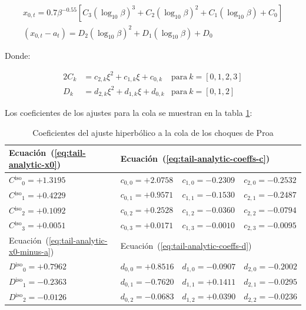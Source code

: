  \begin{align}
   x_{0,t} = 0.7\beta^{-0.55}\left[C_3\left(\log_{10}\beta\right)^3 + C_2\left(\log_{10}\beta\right)^2 +
   C_1\left(\log_{10}\beta\right) + C_0\right] \label{eq:tail-analytic-x0}\\
   (x_{0,t} - a_t) = D_2\left(\log_{10}\beta\right)^2 + D_1\left(\log_{10}\beta\right) + D_0
   \label{eq:tail-analytic-x0-minus-a}
 \end{align}

 Donde:
 
 \begin{alignat}{2}
   \label{eq:tail-analytic-coeffs-c}
   C_k &= c_{2,k}\xi^2 + c_{1,k}\xi + c_{0,k} & \mathrm{para~}k=[0,1,2,3] \\
   \label{eq:tail-analytic-coeffs-d}
   D_k &= d_{2,k}\xi^2 + d_{1,k}\xi + d_{0,k} & \mathrm{para~}k=[0,1,2]
 \end{alignat}

 Los coeficientes de los ajustes para la cola se muestran en la tabla \ref{tab:tail-fit-coeffs}:


\newcommand\iso{\ensuremath{^{\mathrm{iso}}}}

\begin{table}
  \caption{Coeficientes del ajuste hiperbólico a la cola de los choques de Proa}
  \label{tab:tail-fit-coeffs}
  \renewcommand\arraystretch{1.2}
  \setlength\tabcolsep{0.5\tabcolsep}
  \begin{tabular}{@{}llll@{}}
    \toprule
    Ecuación~(\ref{eq:tail-analytic-x0}) & 
    \multicolumn{3}{l}{
    Ecuación~(\ref{eq:tail-analytic-coeffs-c}) \dotfill
    } \\ \midrule
    \( C\iso_0 = +1.3195     \)    
    & \( c_{0,0} = +2.0758   \)  
    & \( c_{1,0} = -0.2309   \)  
    & \( c_{2,0} = -0.2532   \)\\
      \( C\iso_1 = +0.4229     \)    
    & \( c_{0,1} = +0.9571   \)  
    & \( c_{1,1} = -0.1530   \)  
    & \( c_{2,1} = -0.2487   \)\\
      \( C\iso_2 = +0.1092     \)    
    & \( c_{0,2} = +0.2528   \)  
    & \( c_{1,2} = -0.0360   \)  
    & \( c_{2,2} = -0.0794   \)\\
      \( C\iso_3 = +0.0051     \)    
    & \( c_{0,3} = +0.0171   \)  
    & \( c_{1,3} = -0.0010   \)  
    & \( c_{2,3} = -0.0095   \)\\ \midrule
    Ecuación~(\ref{eq:tail-analytic-x0-minus-a}) &
    \multicolumn{3}{l}{
    Ecuación~(\ref{eq:tail-analytic-coeffs-d}) \dotfill
    } \\ \midrule
    \( D\iso_0 = +0.7962   \)    
    & \( d_{0,0} = +0.8516 \)  
    & \( d_{1,0} = -0.0907 \)  
    & \( d_{2,0} = -0.2002 \)\\
      \( D\iso_1 = -0.2363   \)    
    & \( d_{0,1} = -0.7620 \)  
    & \( d_{1,1} = +0.1411 \)  
    & \( d_{2,1} = -0.0295 \)\\
      \( D\iso_2 = -0.0126   \)    
    & \( d_{0,2} = -0.0683 \)  
    & \( d_{1,2} = +0.0390 \)  
    & \( d_{2,2} = -0.0236 \)\\
    \bottomrule
  \end{tabular}
\end{table}

